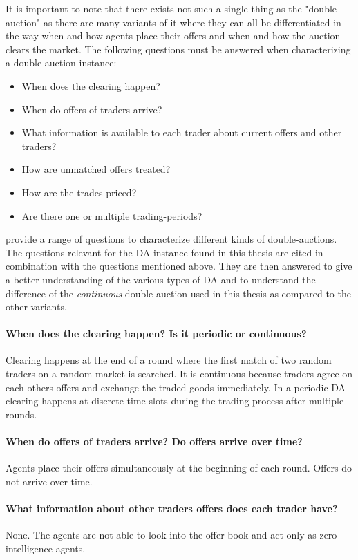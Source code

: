 \documentclass[../Bachelorarbeit.tex]{subfiles}
\begin{document}
\medskip

It is important to note that there exists not such a single thing as the "double auction" as there are many variants of it where they can all be differentiated in the way when and how agents place their offers and when and how the auction clears the market. The following questions must be answered when characterizing a double-auction instance:

\begin{itemize}
\item When does the clearing happen?
\item When do offers of traders arrive?
\item What information is available to each trader about current offers and other traders?
\item How are unmatched offers treated?
\item How are the trades priced?
\item Are there one or multiple trading-periods?
\end{itemize}

\cite{Parsons2006} provide a range of questions to characterize different kinds of double-auctions. The questions relevant for the DA instance found in this thesis are cited in combination with the questions mentioned above. They are then answered to give a better understanding of the various types of DA and to understand the difference of the \textit{continuous} double-auction used in this thesis as compared to the other variants.

\paragraph{When does the clearing happen? Is it periodic or continuous?} Clearing happens at the end of a round where the first match of two random traders on a random market is searched. It is continuous because traders agree on each others offers and exchange the traded goods immediately. In a periodic DA clearing happens at discrete time slots during the trading-process after multiple rounds.

\paragraph{When do offers of traders arrive? Do offers arrive over time?} Agents place their offers simultaneously at the beginning of each round. Offers do not arrive over time.

\paragraph{What information about other traders offers does each trader have?} None. The agents are not able to look into the offer-book and act only as \gls{zero-intelligence agents}.
\end{document}
